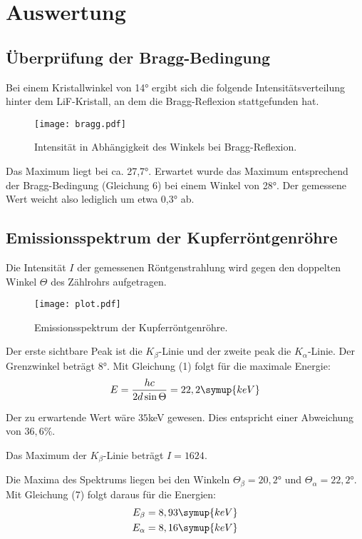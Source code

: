 \section{Auswertung}
\label{sec:Auswertung}

\subsection{Überprüfung der Bragg-Bedingung}

Bei einem Kristallwinkel von 14° ergibt sich die folgende Intensitätsverteilung
hinter dem LiF-Kristall, an dem die Bragg-Reflexion stattgefunden hat.

\begin{figure}
  \centering
  \texttt{[image: bragg.pdf]}
  \caption{Intensität in Abhängigkeit des Winkels bei Bragg-Reflexion.}
  \label{fig:bragg}
\end{figure}

Das Maximum liegt bei ca. 27,7°. Erwartet wurde das Maximum entsprechend der
Bragg-Bedingung (Gleichung 6) bei einem Winkel von 28°. Der gemessene Wert weicht
also lediglich um etwa 0,3° ab.


\subsection{Emissionsspektrum der Kupferröntgenröhre}

Die Intensität $I$ der gemessenen Röntgenstrahlung wird gegen den doppelten Winkel $\Theta$ des Zählrohrs aufgetragen.

\begin{figure}[H]
  \centering
  \texttt{[image: plot.pdf]}
  \caption{Emissionsspektrum der Kupferröntgenröhre.}
  \label{fig:plot}
\end{figure}

Der erste sichtbare Peak ist die $K_{\beta}$-Linie und der zweite peak die $K_{\alpha}$-Linie.
Der Grenzwinkel beträgt $8$°.
Mit Gleichung (1) folgt für die maximale Energie:
\begin{equation*}
  E = \frac{hc}{2d \sin{\Theta}} = 22,2 \symup{keV}
\end{equation*}

Der zu erwartende Wert wäre $35$keV gewesen.
Dies entspricht einer Abweichung von $36,6 \%$.

Das Maximum der $K_{\beta}$-Linie beträgt $I=1624$.

Die Maxima des Spektrums liegen bei den Winkeln $\Theta_{\beta} = 20,2°$ und $\Theta_{\alpha} = 22,2°$.
Mit Gleichung (7) folgt daraus für die Energien:
\begin{align*}
  E_{\beta} &= 8,93 \symup{keV} \\
  E_{\alpha} &= 8,16 \symup{keV}
\end{align*}

